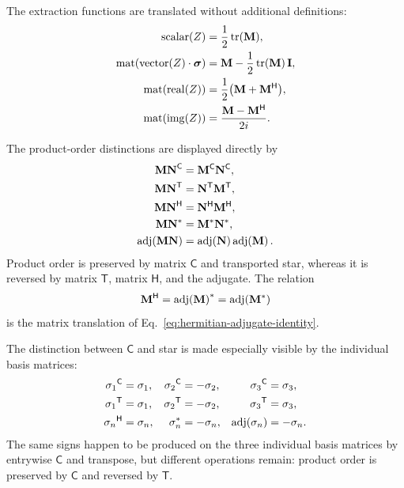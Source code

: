 The extraction functions are translated without additional definitions:
\begin{equation}
\begin{aligned}
\operatorname{scalar}(Z)
&=\frac12\operatorname{tr}(\mathbf{M}),\\
\operatorname{mat}\!\left(\operatorname{vector}(Z)\cdot\mathbf{\bm{\sigma}}\right)
&=\mathbf{M}-\frac12\operatorname{tr}(\mathbf{M})\,\mathbf{I},\\
\operatorname{mat}\!\left(\operatorname{real}(Z)\right)
&=\frac12\bigl(\mathbf{M}+{\mathbf{M}}^{\mathsf H}\bigr),\\
\operatorname{mat}\!\left(\operatorname{img}(Z)\right)
&=\frac{\mathbf{M}-{\mathbf{M}}^{\mathsf H}}{2i}.
\end{aligned}
\label{eq:matrix-extraction-dictionary}
\end{equation}

The product-order distinctions are displayed directly by
\begin{equation}
\begin{aligned}
{\mathbf{M}\mathbf{N}}^{\mathsf C}
&={\mathbf{M}}^{\mathsf C}{\mathbf{N}}^{\mathsf C},\\
{\mathbf{M}\mathbf{N}}^{\mathsf T}
&={\mathbf{N}}^{\mathsf T}{\mathbf{M}}^{\mathsf T},\\
{\mathbf{M}\mathbf{N}}^{\mathsf H}
&={\mathbf{N}}^{\mathsf H}{\mathbf{M}}^{\mathsf H},\\
\mathbf{M}\mathbf{N}^{*}
&=\mathbf{M}^{*}\mathbf{N}^{*},\\
\operatorname{adj}\!\left(\mathbf{M}\mathbf{N}\right)
&=\operatorname{adj}\!\left(\mathbf{N}\right)\operatorname{adj}\!\left(\mathbf{M}\right).
\end{aligned}
\label{eq:matrix-operation-products}
\end{equation}
Product order is preserved by matrix \(\mathsf C\) and transported star,
whereas it is reversed by matrix \(\mathsf T\), matrix \(\mathsf H\), and
the adjugate.
The relation
\begin{equation}
{\mathbf{M}}^{\mathsf H}
=\operatorname{adj}\!\left(\mathbf{M}\right)^{*}
=\operatorname{adj}\!\left(\mathbf{M}^{*}\right)
\label{eq:matrix-hermitian-adjugate}
\end{equation}
is the matrix translation of
Eq.\ \eqref{eq:hermitian-adjugate-identity}.

The distinction between \(\mathsf C\) and star is made especially visible
by the individual basis matrices:
\begin{equation}
\begin{aligned}
{\mathbf{\sigma}_1}^{\mathsf C}&=\mathbf{\sigma}_1,
&
{\mathbf{\sigma}_2}^{\mathsf C}&=-\mathbf{\sigma}_2,
&
{\mathbf{\sigma}_3}^{\mathsf C}&=\mathbf{\sigma}_3,\\
{\mathbf{\sigma}_1}^{\mathsf T}&=\mathbf{\sigma}_1,
&
{\mathbf{\sigma}_2}^{\mathsf T}&=-\mathbf{\sigma}_2,
&
{\mathbf{\sigma}_3}^{\mathsf T}&=\mathbf{\sigma}_3,\\
{\mathbf{\sigma}_n}^{\mathsf H}&=\mathbf{\sigma}_n,
&
\mathbf{\sigma}_n^{*}&=-\mathbf{\sigma}_n,
&
\operatorname{adj}\!\left(\mathbf{\sigma}_n\right)&=-\mathbf{\sigma}_n.
\end{aligned}
\label{eq:matrix-basis-actions}
\end{equation}
The same signs happen to be produced on the three individual basis matrices
by entrywise \(\mathsf C\) and transpose, but different operations remain:
product order is preserved by \(\mathsf C\) and reversed by \(\mathsf T\).

